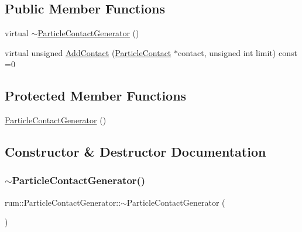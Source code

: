 \subsection*{Public Member Functions}
\begin{DoxyCompactItemize}
\item 
virtual \hyperlink{classrum_1_1_particle_contact_generator_a79743de72e95cfa6db189bc9f0d99b71}{$\sim$\+Particle\+Contact\+Generator} ()
\item 
virtual unsigned \hyperlink{classrum_1_1_particle_contact_generator_a99c829af7d261ff236a4d829374daa9b}{Add\+Contact} (\hyperlink{classrum_1_1_particle_contact}{Particle\+Contact} $\ast$contact, unsigned int limit) const =0
\end{DoxyCompactItemize}
\subsection*{Protected Member Functions}
\begin{DoxyCompactItemize}
\item 
\hyperlink{classrum_1_1_particle_contact_generator_aefec37ffef72a54397c6952c6d2e65ba}{Particle\+Contact\+Generator} ()
\end{DoxyCompactItemize}


\subsection{Constructor \& Destructor Documentation}
\mbox{\label{classrum_1_1_particle_contact_generator_a79743de72e95cfa6db189bc9f0d99b71}} 
\subsubsection{\texorpdfstring{$\sim$\+Particle\+Contact\+Generator()}{~ParticleContactGenerator()}}
{\footnotesize\ttfamily rum\+::\+Particle\+Contact\+Generator\+::$\sim$\+Particle\+Contact\+Generator (\begin{DoxyParamCaption}{ }\end{DoxyParamCaption})\hspace{0.3cm}{\ttfamily [virtual]}}

